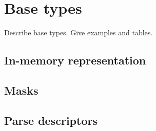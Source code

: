 \chapter{Base types}
\label{chap:base-types}
Describe \pads{} base types.  Give examples and tables. 

\section{In-memory representation}
\label{sec:base-types-rep}
\section{Masks}
\label{sec:base-types-masks}
\section{Parse descriptors}
\label{sec:base-types-parse-descriptors}